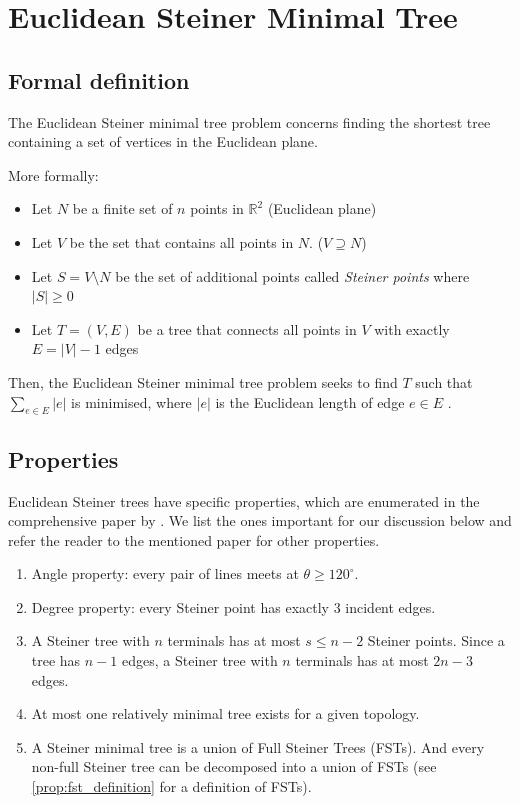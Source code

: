 \documentclass{l4proj}
\begin{document}
\section{Euclidean Steiner Minimal Tree}

\subsection{Formal definition}
The Euclidean Steiner minimal tree problem concerns finding the shortest tree containing a set of vertices in the Euclidean plane.

More formally:
\begin{itemize}
    \item Let $N$ be a finite set of $n$ points in $\mathbb{R}^2$ (Euclidean plane)
    \item Let $V$ be the set that contains all points in $N$. ($V \supseteq N$)
    \item Let $S = V \setminus N$ be the set of additional points called \textit{Steiner points} where $|S| \geq 0$
    \item Let $T = (V, E)$ be a tree that connects all points in $V$ with exactly $E = |V| - 1$ edges
\end{itemize}

Then, the Euclidean Steiner minimal tree problem seeks to find $T$ such that $\sum_{e \in E} |e|$ is minimised, where $|e|$ is the Euclidean length of edge $e \in E$ \citep{Brazil2014}.

\subsection{Properties}
\label{sec:esmt_properties}
Euclidean Steiner trees have specific properties, which are enumerated in the comprehensive paper by \cite{Gilbert1968SteinerMT}. We list the ones important for our discussion below and refer the reader to the mentioned paper for other properties.

\begin{enumerate}
    \item Angle property: every pair of lines meets at $\theta \geq 120^\circ$.
    \item Degree property: every Steiner point has exactly 3 incident edges.
    \item \label{prop:esmt_fst} A Steiner tree with $n$ terminals has at most $s \leq n - 2$ Steiner points. Since a tree has $n - 1$ edges, a Steiner tree with $n$ terminals has at most $2n - 3$ edges.
    \item At most one relatively minimal tree exists for a given topology.
    \item \label{prop:smt_fst} A Steiner minimal tree is a union of Full Steiner Trees (FSTs). And every non-full Steiner tree can be decomposed into a union of FSTs (see \ref{prop:fst_definition} for a definition of FSTs).
\end{enumerate}
\end{document}
